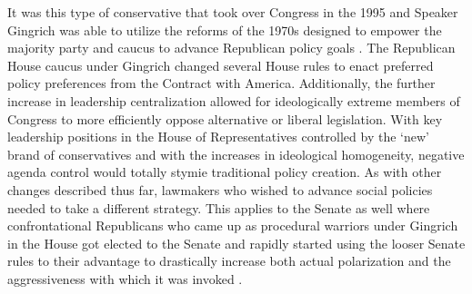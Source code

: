\documentclass[12pt]{article}
\begin{document}
It was this type of conservative that took over Congress in the 1995 and Speaker Gingrich was able to utilize the reforms of the 1970s designed to empower the majority party and caucus to advance Republican policy goals \citep{roberts2003}. The Republican House caucus under Gingrich changed several House rules to enact preferred policy preferences from the Contract with America. Additionally, the further increase in leadership centralization allowed for ideologically extreme members of Congress to more efficiently oppose alternative or liberal legislation. With key leadership positions in the House of Representatives controlled by the `new' brand of conservatives and with the increases in ideological homogeneity, negative agenda control would totally stymie traditional policy creation. As with other changes described thus far, lawmakers who wished to advance social policies needed to take a different strategy. This applies to the Senate as well where confrontational Republicans who came up as procedural warriors under Gingrich in the House got elected to the Senate and rapidly started using the looser Senate rules to their advantage to drastically increase both actual polarization and the aggressiveness with which it was invoked \citep{lee2008, theriault2013}.
\end{document}
